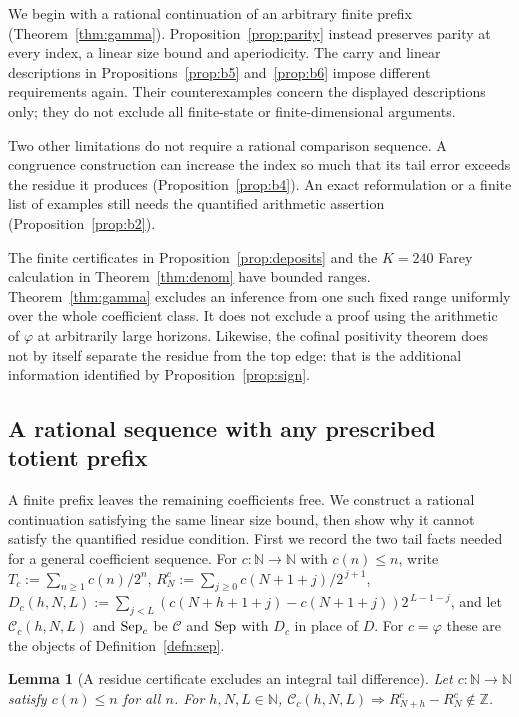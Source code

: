 \documentclass[11pt]{article}
\theoremstyle{plain}
\newtheorem{lem}[thm]{Lemma}
\theoremstyle{definition}
\theoremstyle{remark}
\let\origmathrm\mathrm
\renewcommand{\mathrm}[1]{\ifmmode\origmathrm{#1}\else\textrm{#1}\fi}%
\newcommand{\N}{\mathbb{N}}
\newcommand{\Z}{\mathbb{Z}}
\begin{document}
We begin with a rational continuation of an arbitrary finite prefix
(Theorem~\ref{thm:gamma}). Proposition~\ref{prop:parity} instead
preserves parity at every index, a linear size bound and aperiodicity.
The carry and linear descriptions in Propositions~\ref{prop:b5}
and~\ref{prop:b6} impose different requirements again. Their
counterexamples concern the displayed descriptions only; they do not
exclude all finite-state or finite-dimensional arguments.

Two other limitations do not require a rational comparison sequence.
A congruence construction can increase the index so much that its tail
error exceeds the residue it produces (Proposition~\ref{prop:b4}). An exact
reformulation or a finite list of examples still needs the quantified
arithmetic assertion (Proposition~\ref{prop:b2}).

The finite certificates in Proposition~\ref{prop:deposits} and the $K=240$
Farey calculation in Theorem~\ref{thm:denom} have bounded ranges.
Theorem~\ref{thm:gamma} excludes
an inference from one such fixed range uniformly over the whole coefficient
class. It does not exclude a proof using the arithmetic of $\varphi$ at
arbitrarily large horizons. Likewise, the cofinal positivity theorem does
not by itself separate the residue from the top edge: that is the additional
information identified by Proposition~\ref{prop:sign}.

\subsection{A rational sequence with any prescribed totient prefix}

A finite prefix leaves the remaining coefficients free. We construct a
rational continuation satisfying the same linear size bound, then show why
it cannot satisfy the quantified residue condition. First we record the
two tail facts needed for a general coefficient sequence. For
$c : \N \to \N$ with $c(n) \le n$, write
$T_c := \sum_{n \ge 1} c(n)/2^{n}$,
$R^{c}_{N} := \sum_{j \ge 0} c(N{+}1{+}j)/2^{\,j+1}$,
$D_c(h,N,L) := \sum_{j<L}(c(N{+}h{+}1{+}j) - c(N{+}1{+}j))2^{\,L-1-j}$,
and let $\mathcal C_c(h,N,L)$ and $\mathrm{Sep}_c$ be
$\mathcal{C}$ and $\mathrm{Sep}$ with $D_c$ in place of
${D}$. For $c = \varphi$ these are the objects of
Definition~\ref{defn:sep}.

\begin{lem}[A residue certificate excludes an integral tail difference]
\label{lem:gsound}
Let $c:\N\to\N$ satisfy $c(n)\le n$ for all $n$. For $h,N,L\in\N$,
$\mathcal C_c(h,N,L) \Rightarrow R^{c}_{N+h} - R^{c}_{N} \notin \Z$.
\end{lem}
\end{document}
